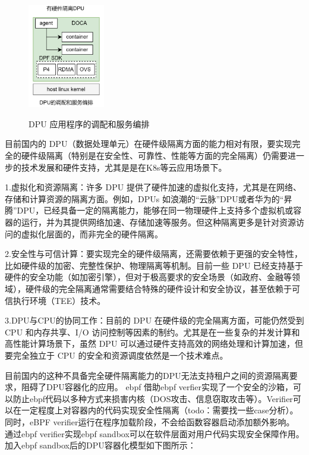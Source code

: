\captionsetup[figure]{justification=justified}
\begin{figure}
	\centering
		\includegraphics[width=0.3\textwidth]{figures/figure2}
 \label{fig:diagram}
 \caption{DPU 应用程序的调配和服务编排}
 
\end{figure}

目前国内的 DPU（数据处理单元）在硬件级隔离方面的能力相对有限，要实现完全的硬件级隔离（特别是在安全性、可靠性、性能等方面的完全隔离）仍需要进一步的技术发展和硬件支持，尤其是是在K8s等云应用场景下。

1.虚拟化和资源隔离：许多 DPU 提供了硬件加速的虚拟化支持，尤其是在网络、存储和计算资源的隔离方面。例如，DPUs 如浪潮的“云脉”DPU或者华为的“昇腾”DPU，已经具备一定的隔离能力，能够在同一物理硬件上支持多个虚拟机或容器的运行，并为其提供网络加速、存储加速等服务。但这种隔离更多是针对资源访问的虚拟化层面的，而非完全的硬件隔离。

2.安全性与可信计算：要实现完全的硬件级隔离，还需要依赖于更强的安全特性，比如硬件级的加密、完整性保护、物理隔离等机制。目前一些 DPU 已经支持基于硬件的安全功能（如加密引擎），但对于极高要求的安全场景（如政府、金融等领域），硬件级的完全隔离通常需要结合特殊的硬件设计和安全协议，甚至依赖于可信执行环境（TEE）技术。

3.DPU与CPU的协同工作：目前的 DPU 在硬件级的完全隔离方面，可能仍然受到 CPU 和内存共享、I/O 访问控制等因素的制约。尤其是在一些复杂的并发计算和高性能计算场景下，虽然 DPU 可以通过硬件支持高效的网络处理和计算加速，但要完全独立于 CPU 的安全和资源调度依然是一个技术难点。

目前国内的这种不具备完全硬件隔离能力的DPU无法支持租户之间的资源隔离要求，阻碍了DPU容器化的应用。
ebpf 借助ebpf verfier实现了一个安全的沙箱，可以防止ebpf代码以多种方式来损害内核（DOS攻击、信息窃取攻击等）。Verifier可以在一定程度上对容器内的代码实现安全性隔离（todo：需要找一些case分析）。同时，eBPF verifier运行在程序加载阶段，不会给函数容器启动添加额外影响。 通过ebpf verifier实现ebpf sandbox可以在软件层面对用户代码实现安全保障作用。加入ebpf sandbox后的DPU容器化模型如下图所示：

